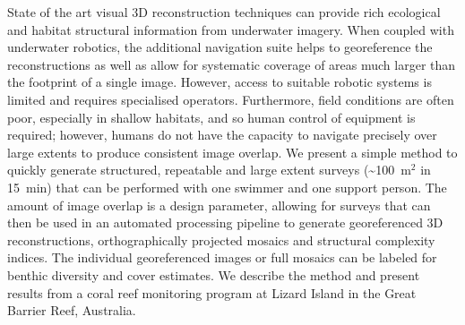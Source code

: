
State of the art visual 3D reconstruction techniques can provide rich ecological and habitat structural information from underwater imagery. When coupled with underwater robotics, the additional navigation suite helps to georeference the reconstructions as well as allow for systematic coverage of areas much larger than the footprint of a single image. However, access to suitable robotic systems is limited and requires specialised operators. Furthermore, field conditions are often poor, especially in shallow habitats, and so human control of equipment is required; however, humans do not have the capacity to navigate precisely over large extents to produce consistent image overlap. We present a simple method to quickly generate structured, repeatable and large extent surveys (\sim{100~m$^{2}$ in 15~min}) that can be performed with one swimmer and one support person. The amount of image overlap is a design parameter, allowing for surveys that can then be used in an automated processing pipeline to generate georeferenced 3D reconstructions, orthographically projected mosaics and structural complexity indices. The individual georeferenced images or full mosaics can be labeled for benthic diversity and cover estimates. We describe the method and present results from a coral reef monitoring program at Lizard Island in the Great Barrier Reef, Australia.
  
  